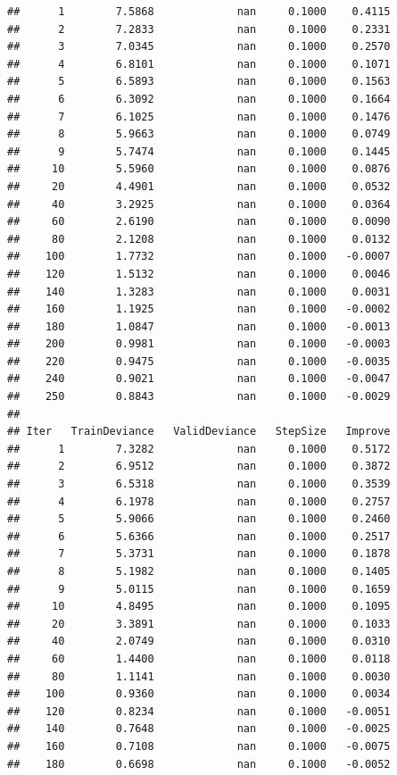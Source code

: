 \documentclass[]{book}
\begin{document}
\begin{verbatim}
##      1        7.5868             nan     0.1000    0.4115
##      2        7.2833             nan     0.1000    0.2331
##      3        7.0345             nan     0.1000    0.2570
##      4        6.8101             nan     0.1000    0.1071
##      5        6.5893             nan     0.1000    0.1563
##      6        6.3092             nan     0.1000    0.1664
##      7        6.1025             nan     0.1000    0.1476
##      8        5.9663             nan     0.1000    0.0749
##      9        5.7474             nan     0.1000    0.1445
##     10        5.5960             nan     0.1000    0.0876
##     20        4.4901             nan     0.1000    0.0532
##     40        3.2925             nan     0.1000    0.0364
##     60        2.6190             nan     0.1000    0.0090
##     80        2.1208             nan     0.1000    0.0132
##    100        1.7732             nan     0.1000   -0.0007
##    120        1.5132             nan     0.1000    0.0046
##    140        1.3283             nan     0.1000    0.0031
##    160        1.1925             nan     0.1000   -0.0002
##    180        1.0847             nan     0.1000   -0.0013
##    200        0.9981             nan     0.1000   -0.0003
##    220        0.9475             nan     0.1000   -0.0035
##    240        0.9021             nan     0.1000   -0.0047
##    250        0.8843             nan     0.1000   -0.0029
## 
## Iter   TrainDeviance   ValidDeviance   StepSize   Improve
##      1        7.3282             nan     0.1000    0.5172
##      2        6.9512             nan     0.1000    0.3872
##      3        6.5318             nan     0.1000    0.3539
##      4        6.1978             nan     0.1000    0.2757
##      5        5.9066             nan     0.1000    0.2460
##      6        5.6366             nan     0.1000    0.2517
##      7        5.3731             nan     0.1000    0.1878
##      8        5.1982             nan     0.1000    0.1405
##      9        5.0115             nan     0.1000    0.1659
##     10        4.8495             nan     0.1000    0.1095
##     20        3.3891             nan     0.1000    0.1033
##     40        2.0749             nan     0.1000    0.0310
##     60        1.4400             nan     0.1000    0.0118
##     80        1.1141             nan     0.1000    0.0030
##    100        0.9360             nan     0.1000    0.0034
##    120        0.8234             nan     0.1000   -0.0051
##    140        0.7648             nan     0.1000   -0.0025
##    160        0.7108             nan     0.1000   -0.0075
##    180        0.6698             nan     0.1000   -0.0052

\end{verbatim}
\end{document}
